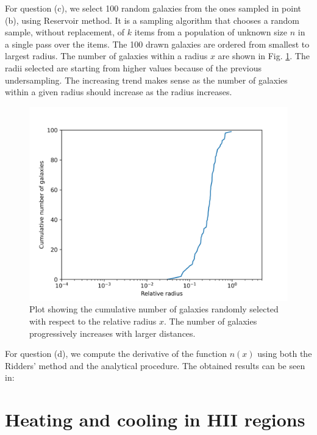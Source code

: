 For question (c), we select 100 random galaxies from the ones sampled in point (b), using Reservoir method. It is a sampling algorithm that chooses a random sample, without replacement, of $k$ items from a population of unknown size $n$ in a single pass over the items. The 100 drawn galaxies are ordered from smallest to largest radius. The number of galaxies within a radius $x$ are shown in Fig. \ref{fig:cum_galaxies}. The radii selected are starting from higher values because of the previous undersampling. The increasing trend makes sense as the number of galaxies within a given radius should increase as the radius increases.

\begin{figure}[h!]
  \centering
  \includegraphics[width=0.9\linewidth]{./plots/my_solution_1c.png}
  \caption{Plot showing the cumulative number of galaxies randomly selected with respect to the relative radius $x$. The number of galaxies progressively increases with larger distances.}
  \label{fig:cum_galaxies}
\end{figure}

For question (d), we compute the derivative of the function $n(x)$ using both the Ridders' method and the analytical procedure. The obtained results can be seen in: 


\section{Heating and cooling in HII regions}

